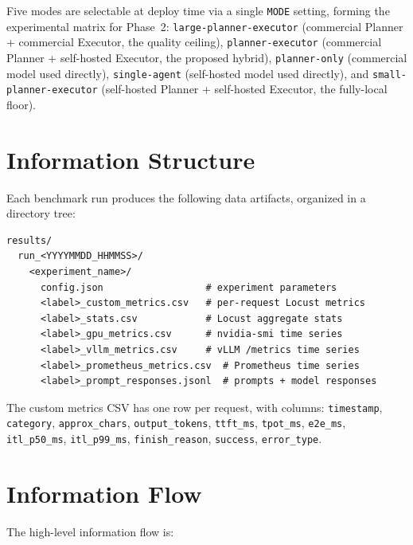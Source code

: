\documentclass[a4paper,12pt]{report}
\begin{document}
Five modes are selectable at deploy time via a single \texttt{MODE} setting, forming the experimental matrix for Phase~2: \texttt{large-planner-executor} (commercial Planner + commercial Executor, the quality ceiling), \texttt{planner-executor} (commercial Planner + self-hosted Executor, the proposed hybrid), \texttt{planner-only} (commercial model used directly), \texttt{single-agent} (self-hosted model used directly), and \texttt{small-planner-executor} (self-hosted Planner + self-hosted Executor, the fully-local floor).

\section{Information Structure}

Each benchmark run produces the following data artifacts, organized in a directory tree:

\begin{verbatim}
results/
  run_<YYYYMMDD_HHMMSS>/
    <experiment_name>/
      config.json                  # experiment parameters
      <label>_custom_metrics.csv   # per-request Locust metrics
      <label>_stats.csv            # Locust aggregate stats
      <label>_gpu_metrics.csv      # nvidia-smi time series
      <label>_vllm_metrics.csv     # vLLM /metrics time series
      <label>_prometheus_metrics.csv  # Prometheus time series
      <label>_prompt_responses.jsonl  # prompts + model responses
\end{verbatim}

The custom metrics CSV has one row per request, with columns: \texttt{timestamp}, \texttt{category}, \texttt{approx\_chars}, \texttt{output\_tokens}, \texttt{ttft\_ms}, \texttt{tpot\_ms}, \texttt{e2e\_ms}, \texttt{itl\_p50\_ms}, \texttt{itl\_p99\_ms}, \texttt{finish\_reason}, \texttt{success}, \texttt{error\_type}.

\section{Information Flow}

The high-level information flow is:
\end{document}
